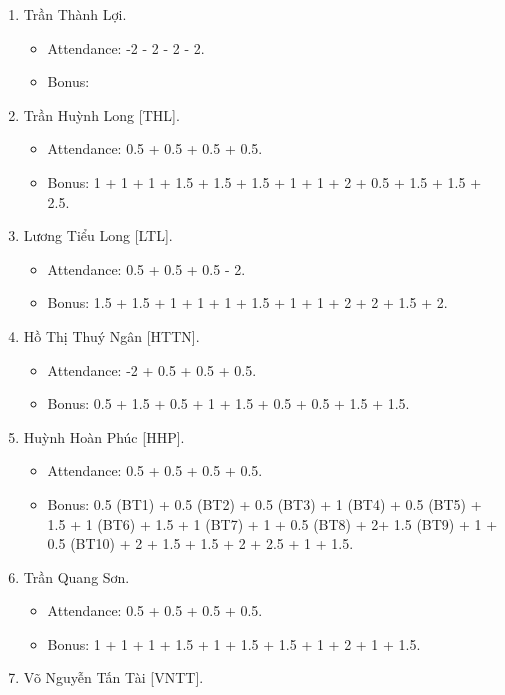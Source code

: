 \documentclass{article}
\begin{document}
\begin{enumerate}
\begin{itemize}
    \end{itemize}
    \item {\sc Trần Thành Lợi.}
    \begin{itemize}
        \item Attendance: -2 - 2 - 2 - 2.
        \item Bonus:
    \end{itemize}
    \item {\sc Trần Huỳnh Long [THL].}
    \begin{itemize}
        \item Attendance: 0.5 + 0.5 + 0.5 + 0.5.
        \item Bonus: 1 + 1 + 1 + 1.5 + 1.5 + 1.5 + 1 + 1 + 2 + 0.5 + 1.5 + 1.5 + 2.5.
    \end{itemize}
    \item {\sc Lương Tiểu Long [LTL].}
    \begin{itemize}
        \item Attendance: 0.5 + 0.5 + 0.5 - 2.
        \item Bonus: 1.5 + 1.5 + 1 + 1 + 1 + 1.5 + 1 + 1 + 2 + 2 + 1.5 + 2.
    \end{itemize}
    \item {\sc Hồ Thị Thuý Ngân [HTTN].}
    \begin{itemize}
        \item Attendance: -2 + 0.5 + 0.5 + 0.5.
        \item Bonus: 0.5 + 1.5 + 0.5 + 1 + 1.5 + 0.5 + 0.5 + 1.5 + 1.5.
    \end{itemize}
    \item {\sc Huỳnh Hoàn Phúc [HHP].}
    \begin{itemize}
        \item Attendance: 0.5 + 0.5 + 0.5 + 0.5.
        \item Bonus: 0.5 (BT1) + 0.5 (BT2) + 0.5 (BT3) + 1 (BT4) + 0.5 (BT5) + 1.5 + 1 (BT6) + 1.5 + 1 (BT7) + 1 + 0.5 (BT8) + 2+ 1.5 (BT9) + 1 +  0.5 (BT10) + 2 + 1.5 + 1.5 + 2 + 2.5 + 1 + 1.5.
    \end{itemize}
    \item {\sc Trần Quang Sơn.}
    \begin{itemize}
        \item Attendance: 0.5 + 0.5 + 0.5 + 0.5.
        \item Bonus: 1 + 1 + 1 + 1.5 + 1 + 1.5 + 1.5 + 1 + 2 + 1 + 1.5.
    \end{itemize}
    \item {\sc Võ Nguyễn Tấn Tài [VNTT].}
    \begin{itemize}

\end{itemize}
\end{enumerate}
\end{document}
